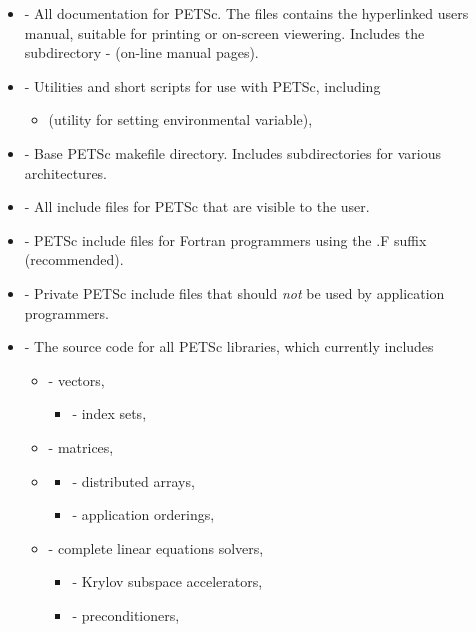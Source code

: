 \begin{itemize}
\item {} - All documentation for PETSc. The files 
                   contains the hyperlinked users manual, suitable for printing
                   or on-screen viewering. Includes the subdirectory
 \subitem -  (on-line manual pages).
\item {} - Utilities and short scripts for use with PETSc, including
 \begin{itemize}
 \item {} (utility for setting  environmental variable),
 \end{itemize}

\item {} - Base PETSc makefile directory.  Includes subdirectories
                    for various architectures.
\item {} - All include files for PETSc that are visible to the user.
\item {}    - PETSc include files for Fortran programmers using 
                                  the .F suffix (recommended).
\item {}    - Private PETSc include files that should {\em not} 
                                  be used by application programmers.
\item {} - The source code for all PETSc libraries, which
                  currently includes
 \begin{itemize}
 \item {} - vectors,
   \begin{itemize}
     \item {} - index sets,
   \end{itemize}
 \item {} - matrices,
 \item {}
   \begin{itemize}
    \item {} - distributed arrays,
    \item {} - application orderings,
   \end{itemize}
 \item {} - complete linear equations solvers,
 \begin{itemize}
   \item {} - Krylov subspace accelerators,
   \item {} - preconditioners,

\end{itemize}
\end{itemize}
\end{itemize}
